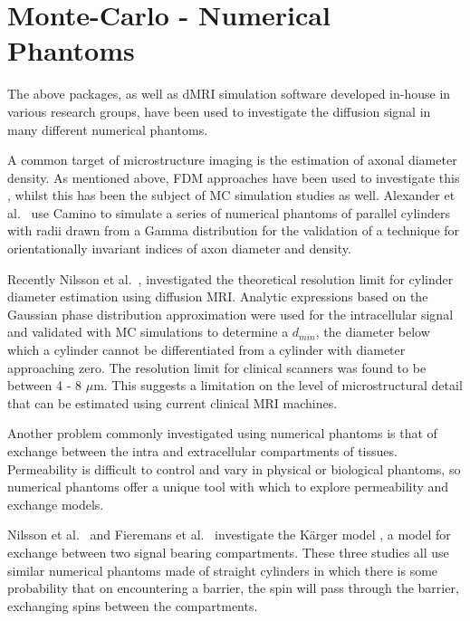 \section{Monte-Carlo - Numerical Phantoms}
\label{sec:app_monte_carlo_numerical_phantoms}
The above packages, as well as dMRI simulation software developed in-house in various research groups, have been used to investigate the diffusion signal in many different numerical phantoms. 

A common target of microstructure imaging is the estimation of axonal diameter density.
As mentioned above, FDM approaches have been used to investigate this \cite{Chin2002,Xu2014}, whilst this has been the subject of MC simulation studies as well.
Alexander et al.\ \cite{Alexander2010} use Camino to simulate a series of numerical phantoms of parallel cylinders with radii drawn from a Gamma distribution for the validation of a technique for orientationally invariant indices of axon diameter and density.

Recently Nilsson et al.\ \cite{Nilsson2017}, investigated the theoretical resolution limit for cylinder diameter estimation using diffusion MRI. Analytic expressions based on the Gaussian phase distribution approximation \cite{Price1997} were used for the intracellular signal and validated with MC simulations to determine a $d_{min}$, the diameter below which a cylinder cannot be differentiated from a cylinder with diameter approaching zero. The resolution limit for clinical scanners was found to be between 4 - 8 $\mu$m.
This suggests a limitation on the level of microstructural detail that can be estimated using current clinical MRI machines.


Another problem commonly investigated using numerical phantoms is that of exchange between the intra and extracellular compartments of tissues.
Permeability is difficult to control and vary in physical or biological phantoms, so numerical phantoms offer a unique tool with which to explore permeability and exchange models.

Nilsson et al.\ \cite{Nilsson2009, Nilsson2010} and Fieremans et al.\ \cite{Fieremans2010} investigate the K\"arger model \cite{KARGER1988}, a model for exchange between two signal bearing compartments.
These three studies all use similar numerical phantoms made of straight cylinders in which there is some probability that on encountering a barrier, the spin will pass through the barrier, exchanging spins between the compartments.

